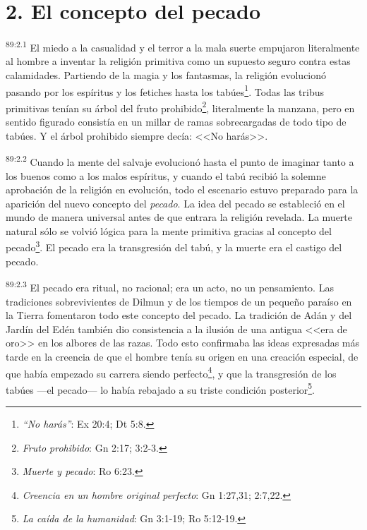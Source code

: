 \documentclass[twoside, 11pt]{book}
\begin{document}
\section*{2. El concepto del pecado}
\par
\textsuperscript{89:2.1} El miedo a la casualidad y el terror a la mala suerte empujaron literalmente al hombre a inventar la religión primitiva como un supuesto seguro contra estas calamidades. Partiendo de la magia y los fantasmas, la religión evolucionó pasando por los espíritus y los fetiches hasta los tabúes\footnote{\textit{``No harás''}: Ex 20:4; Dt 5:8.}. Todas las tribus primitivas tenían su árbol del fruto prohibido\footnote{\textit{Fruto prohibido}: Gn 2:17; 3:2-3.}, literalmente la manzana, pero en sentido figurado consistía en un millar de ramas sobrecargadas de todo tipo de tabúes. Y el árbol prohibido siempre decía: <<No harás>>.

\par
\textsuperscript{89:2.2} Cuando la mente del salvaje evolucionó hasta el punto de imaginar tanto a los buenos como a los malos espíritus, y cuando el tabú recibió la solemne aprobación de la religión en evolución, todo el escenario estuvo preparado para la aparición del nuevo concepto del \textit{pecado}. La idea del pecado se estableció en el mundo de manera universal antes de que entrara la religión revelada. La muerte natural sólo se volvió lógica para la mente primitiva gracias al concepto del pecado\footnote{\textit{Muerte y pecado}: Ro 6:23.}. El pecado era la transgresión del tabú, y la muerte era el castigo del pecado.

\par
\textsuperscript{89:2.3} El pecado era ritual, no racional; era un acto, no un pensamiento. Las tradiciones sobrevivientes de Dilmun y de los tiempos de un pequeño paraíso en la Tierra fomentaron todo este concepto del pecado. La tradición de Adán y del Jardín del Edén también dio consistencia a la ilusión de una antigua <<era de oro>> en los albores de las razas. Todo esto confirmaba las ideas expresadas más tarde en la creencia de que el hombre tenía su origen en una creación especial, de que había empezado su carrera siendo perfecto\footnote{\textit{Creencia en un hombre original perfecto}: Gn 1:27,31; 2:7,22.}, y que la transgresión de los tabúes ---el pecado--- lo había rebajado a su triste condición posterior\footnote{\textit{La caída de la humanidad}: Gn 3:1-19; Ro 5:12-19.}.
\end{document}
